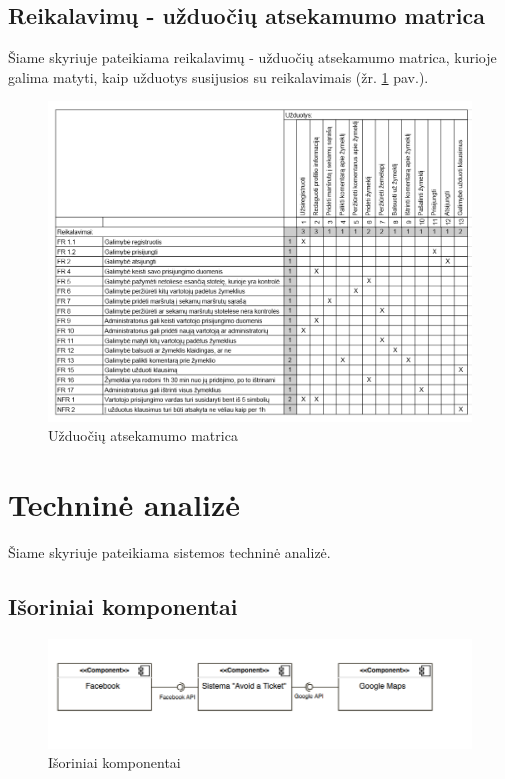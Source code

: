 \documentclass{VUMIFPSkursinis}
\begin{document}
\subsection{Reikalavimų - užduočių atsekamumo matrica}
Šiame skyriuje pateikiama reikalavimų - užduočių atsekamumo matrica, kurioje galima matyti, kaip užduotys susijusios su reikalavimais (žr. \ref{img:Užduočių matrica} pav.).
	\begin{figure}[H]
				\centering
				\includegraphics[scale=0.4]{img/uzduociu_matrica}
				\caption{Užduočių atsekamumo matrica}
				\label{img:Užduočių matrica}
			\end{figure}
			
\section{Techninė analizė}
Šiame skyriuje pateikiama sistemos techninė analizė.
\subsection{Išoriniai komponentai}

\begin{figure}[H]
	\centering
	\includegraphics[scale=0.7]{img/Isoriniai_komponentai}
	\caption{Išoriniai komponentai}
	\label{img:Išoriniai komponentai}
\end{figure}
\end{document}
